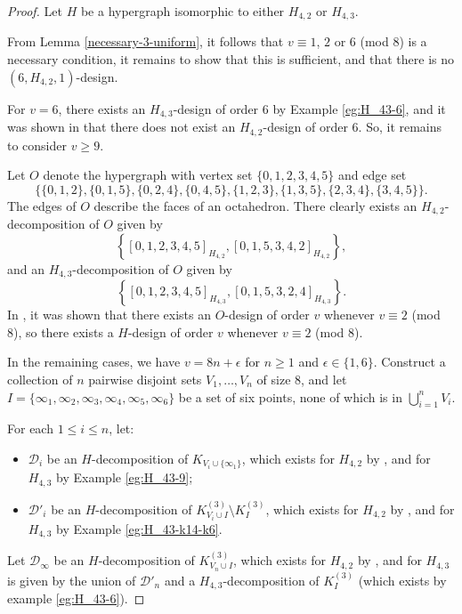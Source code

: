 \begin{proof}
Let $H$ be a hypergraph isomorphic to either $H_{4,2}$ or $H_{4,3}$.

From Lemma \ref{necessary-3-uniform}, it follows that $v \equiv 1$, $2$ or $6$ (mod $8$) is a necessary condition,
   it remains to show that this is sufficient, and that there is no $(6, H_{4,2}, 1)$-design.

For $v = 6$, there exists an $H_{4,3}$-design of order 6 by Example \ref{eg:H_43-6},
  and it was shown in \cite{bryant} that there does not exist an $H_{4,2}$-design of order 6. So, it remains to consider $v \geq 9$.

Let $O$ denote the hypergraph with vertex set $\{0,1,2,3,4,5\}$ and edge set
\[
    \{\{0,1,2\},\{0,1,5\},\{0,2,4\},\{0,4,5\},\{1,2,3\},\{1,3,5\},\{2,3,4\},\{3,4,5\}\}.
\]
The edges of $O$ describe the faces of an octahedron.
There clearly exists an $H_{4,2}$-decomposition of $O$ given by \[ \left\{ [0,1,2,3,4,5]_{H_{4,2}}, [0,1,5,3,4,2]_{H_{4,2}} \right\}, \]
  and an $H_{4,3}$-decomposition of $O$ given by \[ \left\{[0,1,2,3,4,5]_{H_{4,3}}, [0,1,5,3,2,4]_{H_{4,3}} \right\}. \]
In \cite{hanani}, it was shown that there exists an $O$-design of order $v$ whenever $v \equiv 2$ (mod 8),
  so there exists a $H$-design of order $v$ whenever $v \equiv 2$ (mod 8).


In the remaining cases, we have $v = 8n + \epsilon$ for $n \geq 1$ and $\epsilon \in \{1,6\}$.
Construct a collection of $n$ pairwise disjoint sets $V_1, \ldots, V_n$ of size 8,
  and let $I = \{\infty_1, \infty_2, \infty_3, \infty_4, \infty_5, \infty_6\}$ be a set of six points, none of which is in $\bigcup_{i=1}^{n} V_i$.

For each $1 \leq i \leq n$, let:
\begin{itemize}
  \item $\mathcal{D}_i$ be an $H$-decomposition of $K_{V_i \cup \{\infty_1\}}$,
  which exists for $H_{4,2}$ by \cite{bryant}, and for $H_{4,3}$ by Example \ref{eg:H_43-9};
  \item $\mathcal{D}'_i$ be an $H$-decomposition of $K_{V_i \cup I}^{(3)} \setminus K_{I}^{(3)}$,
  which exists for $H_{4,2}$ by \cite{bryant}, and for $H_{4,3}$ by Example \ref{eg:H_43-k14-k6}.
\end{itemize}

Let $\mathcal{D}_\infty$ be an $H$-decomposition of $K_{V_n \cup I}^{(3)}$,
  which exists for $H_{4,2}$ by \cite{bryant}, and for $H_{4,3}$ is given by
  the union of $\mathcal{D}'_n$ and a $H_{4,3}$-decomposition of $K_{I}^{(3)}$ (which exists by example \ref{eg:H_43-6}).



\end{proof}
